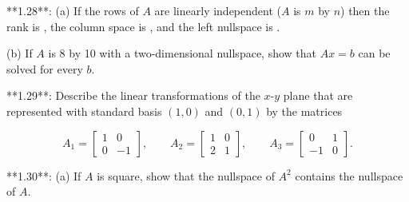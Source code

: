 **1.28**: (a) If the rows of \(A\) are linearly independent (\(A\) is \(m\) by \(n\)) then the rank is , the column space is , and the left nullspace is .

(b) If \(A\) is 8 by 10 with a two-dimensional nullspace, show that \(Ax=b\) can be solved for every \(b\).

**1.29**: Describe the linear transformations of the \(x\)-\(y\) plane that are represented with standard basis \((1,0)\) and \((0,1)\) by the matrices

\[A_{1}=\begin{bmatrix}1&0\\ 0&-1\end{bmatrix},\qquad A_{2}=\begin{bmatrix}1&0\\ 2&1\end{bmatrix},\qquad A_{3}=\begin{bmatrix}0&1\\ -1&0\end{bmatrix}.\]

**1.30**: (a) If \(A\) is square, show that the nullspace of \(A^{2}\) contains the nullspace of \(A\).

